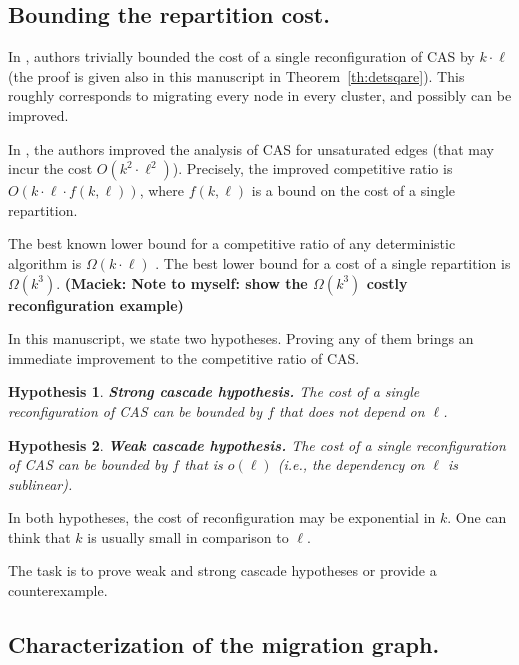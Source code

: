 \documentclass[a4paper,USenglish]{lipics-v2019}
\newcommand{\DET}{\textsf{CAS}\xspace}
\newtheorem{hypothesis}{Hypothesis}
\newcommand\maciek[1]{\color{brown}\textbf{(Maciek: #1)}\color{black}}
\begin{document}
\subsection{Bounding the repartition cost.}

In \cite{repartition-disc}, authors trivially bounded the cost of a single reconfiguration 
of \DET
by
$k \cdot \ell$ (the proof is given also in this
manuscript in Theorem~\ref{th:detsqare}).
This roughly corresponds to migrating every node in every cluster, and possibly can be improved.

In \cite{disc2020}, the authors improved the analysis of \DET for
unsaturated edges (that may incur the cost $O(k^2\cdot \ell^2)$).
Precisely, the improved competitive ratio is $O(k\cdot \ell \cdot f(k, \ell))$, where $f(k,
\ell)$ is a bound on the cost of a single repartition.


The best known lower bound for a competitive ratio of any deterministic algorithm is $\Omega(k\cdot \ell)$ \cite{disc2020}.
The best lower bound for a cost of a single repartition is $\Omega(k^3)$.
\maciek{Note to myself: show the $\Omega(k^3)$ costly reconfiguration example}

\medskip

In this manuscript, we state two hypotheses. Proving any of them brings an
immediate improvement to the competitive ratio of \DET.

\begin{hypothesis}\textbf{Strong cascade hypothesis.} The cost of a single
reconfiguration of \DET can be bounded by $f$ that does not depend on $\ell$.
\end{hypothesis}

\begin{hypothesis}
    \textbf{Weak cascade hypothesis.}
The cost of a single reconfiguration of \DET can be bounded by $f$ that is $o(\ell)$ (i.e., the dependency on $\ell$ is
sublinear).
\end{hypothesis}

In both hypotheses, the cost of reconfiguration may be exponential in $k$.
One can think that $k$ is usually small in comparison to $\ell$.

The task is to prove weak and strong cascade hypotheses or provide a
counterexample.



\subsection{Characterization of the migration graph.}
\end{document}
